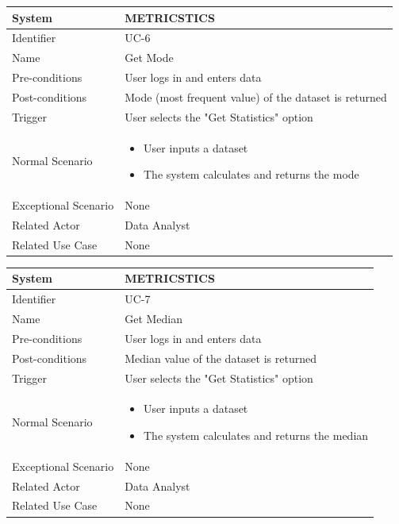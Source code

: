 \documentclass[letterpaper,12pt]{article}
\begin{document}
\begin{itemize}
\begin{tabular}{|p{1.45in}|p{3.65in}|}
    \hline
    System & METRICSTICS \\
    \hline
    Identifier & UC-6 \\
    \hline
    Name &  Get Mode \\
    \hline
    Pre-conditions & User logs in and enters data\\
   \hline
    Post-conditions & Mode (most frequent value) of the dataset is returned\\
   \hline
    Trigger & User selects the "Get Statistics" option \\
    \hline
    Normal Scenario &  \begin{itemize}
   \item User inputs a dataset
   \item The system calculates and returns the mode
   \end{itemize}\\
    \hline
    Exceptional Scenario & None \\
    \hline
    Related Actor& Data Analyst\\
    \hline
    Related Use Case & None\\
\hline
\end{tabular}
\bigskip
\bigskip

\begin{tabular}{|p{1.45in}|p{3.65in}|}
    \hline
    System & METRICSTICS \\
    \hline
    Identifier & UC-7 \\
    \hline
    Name &  Get Median \\
    \hline
    Pre-conditions & User logs in and enters data\\
   \hline
    Post-conditions & Median value of the dataset is returned\\
   \hline
    Trigger & User selects the "Get Statistics" option \\
    \hline
    Normal Scenario &  \begin{itemize}
   \item User inputs a dataset
   \item The system calculates and returns the median
   \end{itemize}\\
    \hline
    Exceptional Scenario & None \\
    \hline
    Related Actor& Data Analyst\\
    \hline
    Related Use Case & None\\
\hline
\end{tabular}
\bigskip
\bigskip


\end{itemize}
\end{document}
